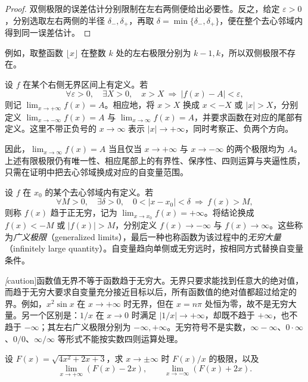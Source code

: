 \begin{proof}
双侧极限的误差估计分别限制在左右两侧便给出必要性。反之，给定 $\varepsilon>0$，分别选取左右两侧的半径 $\delta_-,\delta_+$，再取 $\delta=\min\{\delta_-,\delta_+\}$，便在整个去心邻域内得到同一误差估计。
\end{proof}

例如，取整函数 $\lfloor x\rfloor$ 在整数 $k$ 处的左右极限分别为 $k-1,k$，所以双侧极限不存在。

\begin{definition}
\label{def:function-limits-at-infinity}
设 $f$ 在某个右侧无界区间上有定义。若
\[
    \forall\varepsilon>0,\quad\exists X>0,\quad
    x>X\ \Longrightarrow\ |f(x)-A|<\varepsilon,
\]
则记 $\lim_{x\to+\infty}f(x)=A$。相应地，将 $x>X$ 换成 $x<-X$ 或 $|x|>X$，分别定义 $\lim_{x\to-\infty}f(x)=A$ 与 $\lim_{x\to\infty}f(x)=A$，并要求函数在对应的尾部有定义。这里不带正负号的 $x\to\infty$ 表示 $|x|\to+\infty$，同时考察正、负两个方向。
\end{definition}

因此，$\lim_{x\to\infty}f(x)=A$ 当且仅当 $x\to+\infty$ 与 $x\to-\infty$ 的两个极限均为 $A$。上述有限极限仍有唯一性、相应尾部上的有界性、保序性、四则运算与夹逼性质，只需在证明中把去心邻域换成对应的自变量范围。

\begin{definition}
\label{def:generalized-function-limits}
设 $f$ 在 $x_0$ 的某个去心邻域内有定义。若
\[
    \forall M>0,\quad\exists\delta>0,\quad
    0<|x-x_0|<\delta\ \Longrightarrow\ f(x)>M,
\]
则称 $f(x)$ 趋于正无穷，记为 $\lim_{x\to x_0}f(x)=+\infty$。将结论换成 $f(x)<-M$ 或 $|f(x)|>M$，分别定义 $f(x)\to-\infty$ 与 $f(x)\to\infty$。这些称为\emph{广义极限}（generalized limits），最后一种也称函数为该过程中的\emph{无穷大量}（infinitely large quantity）。自变量趋向单侧或无穷远时，按相同方式替换自变量条件。
\end{definition}

\emph[caution]{函数值无界不等于函数趋于无穷大。}无界只要求能找到任意大的绝对值，而趋于无穷大要求自变量充分接近目标以后，所有函数值的绝对值都超过给定的界。例如，$x^2\sin x$ 在 $x\to+\infty$ 时无界，但在 $x=n\pi$ 处恒为零，故不是无穷大量。另一个区别是：$1/x$ 在 $x\to0$ 时满足 $|1/x|\to+\infty$，却既不趋于 $+\infty$，也不趋于 $-\infty$；其左右广义极限分别为 $-\infty,+\infty$。无穷符号不是实数，$\infty-\infty$、$0\cdot\infty$、$0/0$、$\infty/\infty$ 等形式不能按实数四则运算处理。

\begin{example}
\label{ex:radical-limits-at-infinity}
设 $F(x)=\sqrt{4x^2+2x+3}$，求 $x\to\pm\infty$ 时 $F(x)/x$ 的极限，以及
\[
    \lim_{x\to+\infty}(F(x)-2x),
    \qquad \lim_{x\to-\infty}(F(x)+2x).
\]
\end{example}

